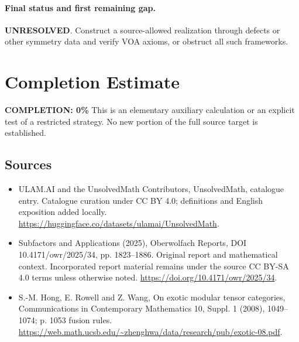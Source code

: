 \documentclass[11pt]{article}
\begin{document}
\paragraph{Final status and first remaining gap.}
\textbf{UNRESOLVED}. Construct a source-allowed realization through defects or other symmetry data and verify VOA axioms, or obstruct all such frameworks.

\section{Completion Estimate}
\noindent\textbf{COMPLETION: 0\%}
This is an elementary auxiliary calculation or an explicit test of a restricted strategy. No new portion of the full source target is established.

\subsection{Sources}
\begin{itemize}
\item[\hypertarget{source:statement:1}{S1}] ULAM.AI and the UnsolvedMath Contributors, UnsolvedMath, catalogue entry. Catalogue curation under CC BY 4.0; definitions and English exposition added locally.
\url{https://huggingface.co/datasets/ulamai/UnsolvedMath}.
\item[\hypertarget{source:statement:2}{S2}] Subfactors and Applications (2025), Oberwolfach Reports, DOI 10.4171/owr/2025/34, pp. 1823--1886. Original report and mathematical context. Incorporated report material remains under the source CC BY-SA 4.0 terms unless otherwise noted.
\url{https://doi.org/10.4171/owr/2025/34}.
\end{itemize}
\label{end:statement}

\begin{itemize}
\item[\hypertarget{source:statement:E1}{E1}] S.-M. Hong, E. Rowell and Z. Wang, On exotic modular tensor categories, Communications in Contemporary Mathematics 10, Suppl. 1 (2008), 1049–1074; p. 1053 fusion rules.
\url{https://web.math.ucsb.edu/~zhenghwa/data/research/pub/exotic-08.pdf}.
\end{itemize}
\end{document}
